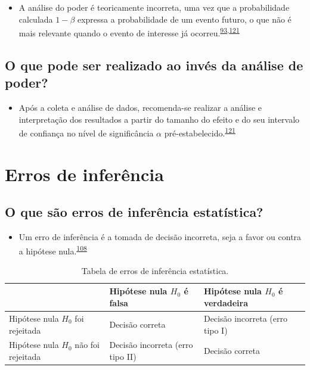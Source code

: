 \documentclass[
  a4paper,
]{book}
\providecommand{\tightlist}{%
  \setlength{\itemsep}{0pt}\setlength{\parskip}{0pt}}
\begin{document}
\begin{itemize}
\tightlist
\item
  A análise do poder é teoricamente incorreta, uma vez que a probabilidade calculada \(1-\beta\) expressa a probabilidade de um evento futuro, o que não é mais relevante quando o evento de interesse já ocorreu.\textsuperscript{\protect\hyperlink{ref-Cummings2003}{93},\protect\hyperlink{ref-heckman2022}{121}}
\end{itemize}

\hypertarget{o-que-pode-ser-realizado-ao-invuxe9s-da-anuxe1lise-de-poder}{%
\subsection{O que pode ser realizado ao invés da análise de poder?}\label{o-que-pode-ser-realizado-ao-invuxe9s-da-anuxe1lise-de-poder}}

\begin{itemize}
\tightlist
\item
  Após a coleta e análise de dados, recomenda-se realizar a análise e interpretação dos resultados a partir do tamanho do efeito e do seu intervalo de confiança no nível de significância \(\alpha\) pré-estabelecido.\textsuperscript{\protect\hyperlink{ref-heckman2022}{121}}
\end{itemize}

\hypertarget{erros-de-inferuxeancia}{%
\section{Erros de inferência}\label{erros-de-inferuxeancia}}

\hypertarget{o-que-suxe3o-erros-de-inferuxeancia-estatuxedstica}{%
\subsection{O que são erros de inferência estatística?}\label{o-que-suxe3o-erros-de-inferuxeancia-estatuxedstica}}

\begin{itemize}
\tightlist
\item
  Um erro de inferência é a tomada de decisão incorreta, seja a favor ou contra a hipótese nula.\textsuperscript{\protect\hyperlink{ref-Curran-Everett2009}{108}}
\end{itemize}

\begin{table}

\caption{\label{tab:erros-interencia}Tabela de erros de inferência estatística.}
\centering
\begin{tabu} to 
\toprule
  & Hipótese nula $H_{0}$ 
 é falsa & Hipótese nula $H_{0}$ 
\textbf{ é verdadeira}\\
\midrule
Hipótese nula $H_{0}$ 
 foi rejeitada & Decisão correta & Decisão incorreta 
 (erro tipo I)\\
Hipótese nula $H_{0}$ 
 não foi rejeitada & Decisão incorreta 
 (erro tipo II) & Decisão correta\\
\bottomrule
\end{tabu}
\end{table}
\end{document}
